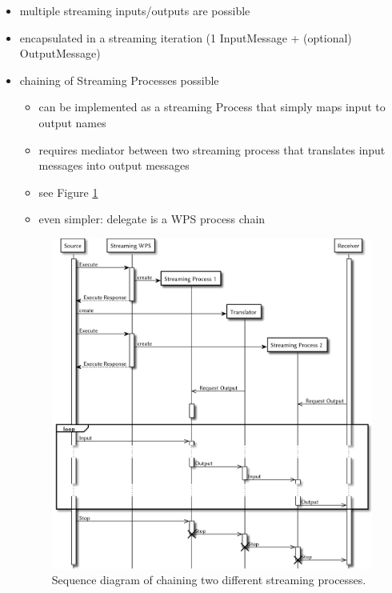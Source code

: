 \begin{itemize}
			\item multiple streaming inputs/outputs are possible
			\item encapsulated in a streaming iteration (1 InputMessage + (optional) OutputMessage)
			\item chaining of Streaming Processes possible
			\begin{itemize}
				\item can be implemented as a streaming Process that simply maps input to output names
				\item requires mediator between two streaming process that translates input messages into output messages
				\item see Figure \ref{fig:sd:chain}
				\item even simpler: delegate is a WPS process chain
			\end{itemize}
			\begin{figure}[!htb]
				\centering
				\includegraphics[width=\textwidth]{figures/sequence-diagramm-chain.pdf} %
				\caption{\label{fig:sd:chain} Sequence diagram of chaining two different streaming processes.}
			\end{figure}
		\end{itemize}
